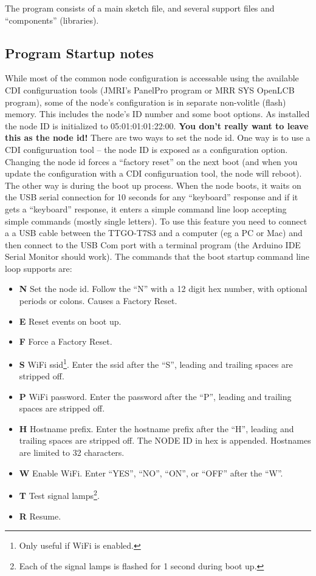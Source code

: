 \documentclass[12pt,twoside]{article}
\begin{document}
The program consists of a main sketch file, and several support files and
``components'' (libraries).

\subsection{Program Startup notes}

While most of the common node configuration is accessable using the available
CDI configuruation tools (JMRI's PanelPro program or MRR SYS OpenLCB program),
some of the node's configuration is in separate non-volitle (flash) memory.
This includes the node's ID number and some boot options. As installed the
node ID is initialized to 05:01:01:01:22:00. \textbf{You don't really want to
leave this as the node id!} There are two ways to set the node id. One way is
to use a CDI configuruation tool -- the node ID is exposed as a configuration
option. Changing the node id forces a ``factory reset'' on the next boot (and
when you update the configuration with a CDI configuruation tool, the node
will reboot). The other way is during the boot up process. When the node
boots, it waits on the USB serial connection for 10 seconds for any
``keyboard'' response and if it gets a ``keyboard'' response, it enters a
simple command line loop accepting simple commands (mostly single letters). To
use this feature you need to connect a a USB cable between the TTGO-T7S3 and a
computer (eg a PC or Mac) and then connect to the USB Com port with a terminal
program (the Arduino IDE Serial Monitor should work). The commands that the
boot startup command line loop supports are:

\begin{itemize}
\item \textbf{N} Set the node id.  Follow the ``N'' with a 12 digit hex 
number, with optional periods or colons.  Causes a Factory Reset.
\item \textbf{E} Reset events on boot up.
\item \textbf{F} Force a Factory Reset.
\item \textbf{S} WiFi ssid\footnote{Only useful if WiFi is 
enabled.\label{fn:wifi}}. Enter the ssid after the ``S'', leading and trailing 
spaces are stripped off.
\item \textbf{P} WiFi password. Enter the password after the 
``P'', leading and trailing spaces are stripped off.
\item \textbf{H} Hostname prefix. Enter the hostname prefix 
after the ``H'', leading and trailing spaces are stripped off. The NODE ID in 
hex is appended.  Hostnames are limited to 32 characters.
\item \textbf{W} Enable WiFi. Enter ``YES'', ``NO'', 
``ON'', or ``OFF'' after the ``W''.
\item \textbf{T} Test signal lamps\footnote{Each of the signal lamps is 
flashed for 1 second during boot up.}.
\item \textbf{R} Resume.
\end{itemize}
\end{document}
